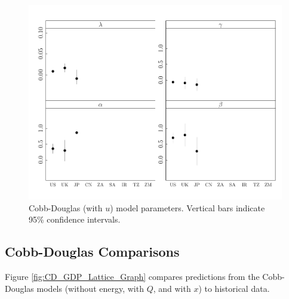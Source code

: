 \documentclass[preprint,authoryear,12pt]{elsarticle}\usepackage{graphicx, color}
\makeatletter
\def\maxwidth{ %
  \ifdim\Gin@nat@width>\linewidth
    \linewidth
  \else
    \Gin@nat@width
  \fi
}
\newenvironment{knitrout}{}{} %
\makeatother
\begin{document}
\begin{knitrout}
\color{fgcolor}\begin{figure}[H]

\includegraphics[width=\maxwidth]{figure/CDu_Params_Graph} \caption[Cobb-Douglas (with $u$) model parameters]{Cobb-Douglas (with $u$) model parameters. Vertical bars indicate 95\% confidence intervals.\label{fig:CDu_Params_Graph}}
\end{figure}


\end{knitrout}


\subsection{Cobb-Douglas Comparisons}

Figure \ref{fig:CD_GDP_Lattice_Graph} compares predictions from the Cobb-Douglas models (without energy, with $Q$, and with $x$) to historical data.
\end{document}
